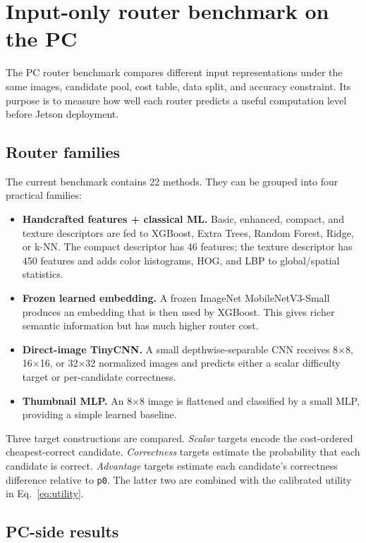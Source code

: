 \documentclass[11pt,a4paper]{article}
\newcommand{\code}[1]{\texttt{#1}}
\begin{document}
\section{Input-only router benchmark on the PC}

The PC router benchmark compares different input representations under the same images, candidate pool, cost table, data split, and accuracy constraint. Its purpose is to measure how well each router predicts a useful computation level before Jetson deployment.

\subsection{Router families}

The current benchmark contains 22 methods. They can be grouped into four practical families:

\begin{itemize}
    \item \textbf{Handcrafted features + classical ML.} Basic, enhanced, compact, and texture descriptors are fed to XGBoost, Extra Trees, Random Forest, Ridge, or k-NN. The compact descriptor has 46 features; the texture descriptor has 450 features and adds color histograms, HOG, and LBP to global/spatial statistics.
    \item \textbf{Frozen learned embedding.} A frozen ImageNet MobileNetV3-Small produces an embedding that is then used by XGBoost. This gives richer semantic information but has much higher router cost.
    \item \textbf{Direct-image TinyCNN.} A small depthwise-separable CNN receives 8$\times$8, 16$\times$16, or 32$\times$32 normalized images and predicts either a scalar difficulty target or per-candidate correctness.
    \item \textbf{Thumbnail MLP.} An 8$\times$8 image is flattened and classified by a small MLP, providing a simple learned baseline.
\end{itemize}

Three target constructions are compared. \emph{Scalar} targets encode the cost-ordered cheapest-correct candidate. \emph{Correctness} targets estimate the probability that each candidate is correct. \emph{Advantage} targets estimate each candidate's correctness difference relative to \code{p0}. The latter two are combined with the calibrated utility in Eq.~\eqref{eq:utility}.

\subsection{PC-side results}
\end{document}
